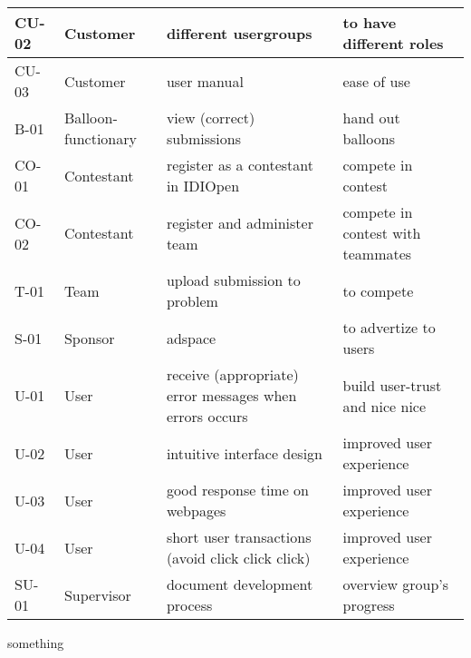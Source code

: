 \begin{tabular}{|p{}|p{}|p{}|p{}|}
\hline
CU-02&Customer& different usergroups&to have different roles\\
\hline
CU-03&Customer&user manual&ease of use\\
\hline
B-01&Balloon-functionary&view (correct) submissions&hand out balloons\\
\hline
CO-01&Contestant&register as a contestant in IDIOpen&compete in contest\\
\hline
CO-02&Contestant&register and administer team&compete in contest with teammates\\
\hline
T-01&Team&upload submission to problem&to compete\\
\hline
S-01&Sponsor&adspace&to advertize to users\\
\hline
U-01&User&receive (appropriate) error messages when errors occurs&build user-trust and nice nice\\
\hline
U-02&User&intuitive interface design&improved user experience\\
\hline
U-03&User&good response time on webpages&improved user experience\\
\hline
U-04&User&short user transactions (avoid click click click)&improved user experience\\
\hline
SU-01&Supervisor&document development process&overview group's progress\\
\hline
\end{tabular}

\newpage

something